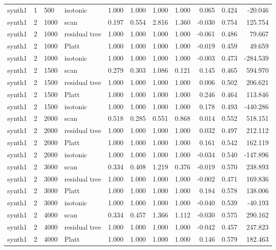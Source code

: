 \begin{tabular}{lrllrrrrrrr}
synth1 & 1 & 500 & isotonic & 1.000 & 1.000 & 1.000 & 1.000 & 0.065 & 0.424 & -20.046 \\
synth1 & 2 & 1000 & scan & 0.197 & 0.554 & 2.816 & 1.360 & -0.030 & 0.754 & 125.754 \\
synth1 & 2 & 1000 & residual tree & 1.000 & 1.000 & 1.000 & 1.000 & -0.061 & 0.486 & 79.667 \\
synth1 & 2 & 1000 & Platt & 1.000 & 1.000 & 1.000 & 1.000 & -0.019 & 0.459 & 49.659 \\
synth1 & 2 & 1000 & isotonic & 1.000 & 1.000 & 1.000 & 1.000 & -0.003 & 0.473 & -284.539 \\
synth1 & 2 & 1500 & scan & 0.279 & 0.303 & 1.086 & 0.121 & 0.145 & 0.465 & 594.970 \\
synth1 & 2 & 1500 & residual tree & 1.000 & 1.000 & 1.000 & 1.000 & 0.006 & 0.502 & 206.621 \\
synth1 & 2 & 1500 & Platt & 1.000 & 1.000 & 1.000 & 1.000 & 0.246 & 0.464 & 113.846 \\
synth1 & 2 & 1500 & isotonic & 1.000 & 1.000 & 1.000 & 1.000 & 0.178 & 0.493 & -440.286 \\
synth1 & 2 & 2000 & scan & 0.518 & 0.285 & 0.551 & 0.868 & 0.014 & 0.552 & 518.151 \\
synth1 & 2 & 2000 & residual tree & 1.000 & 1.000 & 1.000 & 1.000 & 0.032 & 0.497 & 212.112 \\
synth1 & 2 & 2000 & Platt & 1.000 & 1.000 & 1.000 & 1.000 & 0.161 & 0.542 & 162.119 \\
synth1 & 2 & 2000 & isotonic & 1.000 & 1.000 & 1.000 & 1.000 & -0.034 & 0.540 & -147.896 \\
synth1 & 2 & 3000 & scan & 0.334 & 0.408 & 1.219 & 0.376 & -0.019 & 0.570 & 238.893 \\
synth1 & 2 & 3000 & residual tree & 1.000 & 1.000 & 1.000 & 1.000 & -0.002 & 0.471 & 169.836 \\
synth1 & 2 & 3000 & Platt & 1.000 & 1.000 & 1.000 & 1.000 & 0.184 & 0.578 & 138.006 \\
synth1 & 2 & 3000 & isotonic & 1.000 & 1.000 & 1.000 & 1.000 & -0.040 & 0.539 & -40.193 \\
synth1 & 2 & 4000 & scan & 0.334 & 0.457 & 1.366 & 1.112 & -0.030 & 0.575 & 290.162 \\
synth1 & 2 & 4000 & residual tree & 1.000 & 1.000 & 1.000 & 1.000 & -0.042 & 0.457 & 247.823 \\
synth1 & 2 & 4000 & Platt & 1.000 & 1.000 & 1.000 & 1.000 & 0.146 & 0.579 & 182.463 \\

\end{tabular}
